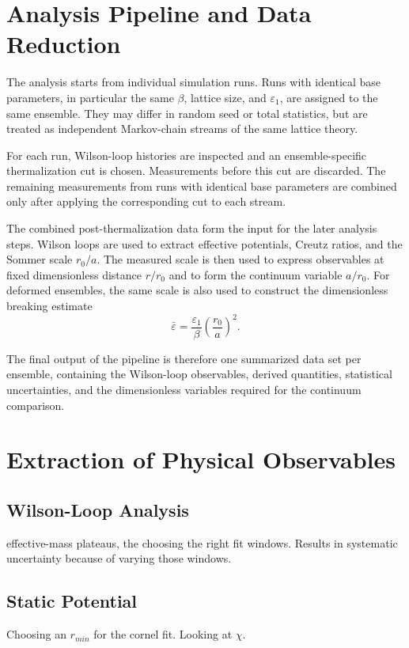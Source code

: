 \documentclass[12pt,a4paper,oneside,numbers=noenddot]{scrreprt}
\newcommand{\eps}{\varepsilon}
\begin{document}
\section{Analysis Pipeline and Data Reduction}
\label{sec:analysis-pipeline}

The analysis starts from individual simulation runs. Runs with identical base
parameters, in particular the same \(\beta\), lattice size, and \(\eps_1\), are
assigned to the same ensemble. They may differ in random seed or total
statistics, but are treated as independent Markov-chain streams of the same
lattice theory.

For each run, Wilson-loop histories are inspected and an ensemble-specific
thermalization cut is chosen. Measurements before this cut are discarded. The
remaining measurements from runs with identical base parameters are combined
only after applying the corresponding cut to each stream.

The combined post-thermalization data form the input for the later analysis
steps. Wilson loops are used to extract effective potentials, Creutz ratios,
and the Sommer scale \(r_0/a\). The measured scale is then used to express
observables at fixed dimensionless distance \(r/r_0\) and to form the continuum
variable \(a/r_0\). For deformed ensembles, the same scale is also used to
construct the dimensionless breaking estimate
\[
  \bar\eps
  =
  \frac{\eps_1}{\beta}
  \left(\frac{r_0}{a}\right)^2 .
\]

The final output of the pipeline is therefore one summarized data set per
ensemble, containing the Wilson-loop observables, derived quantities, statistical
uncertainties, and the dimensionless variables required for the continuum
comparison.

\section{Extraction of Physical Observables}
\subsection{Wilson-Loop Analysis}
effective-mass plateaus, the choosing the right fit windows.
Results in systematic uncertainty because of varying those windows.

\subsection{Static Potential}
Choosing an $r_{min}$ for the cornel fit. Looking at $\chi$. 
\end{document}

